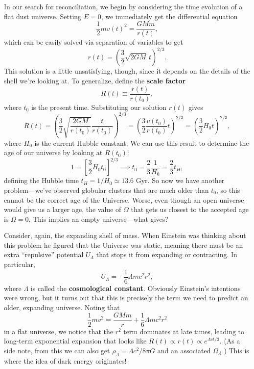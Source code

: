 \documentclass[../a062main.tex]{subfiles}
\begin{document}
In our search for reconciliation, we begin by considering the time evolution of a flat dust universe.
Setting $E = 0$, we immediately get the differential equation
\[ \frac{1}{2} mv(t)^2 = \frac{GMm}{r(t)}, \]
which can be easily solved via separation of variables to get
\[ r(t) = \left( \frac{3}{2} \sqrt{2GM} \,t \right)^{2 / 3}. \]
This solution is a little unsatisfying, though, since it depends on the details of the shell we're looking at.
To generalize, define the \textbf{scale factor}
\[ \boxed{R(t) \equiv \frac{r(t)}{r(t_0)}}, \]
where $t_0$ is the present time.
Substituting our solution $r(t)$ gives
\[ R(t) = \left( \frac{3}{2} \sqrt{\frac{2GM}{r(t_0)}} \frac{t}{r(t_0)} \right)^{2 / 3} = \left( \frac{3}{2} \frac{v(t_0)}{r(t_0)} t \right)^{2 / 3} = \left( \frac{3}{2} H_0 t \right)^{2 / 3}, \]
where $H_0$ is the current Hubble constant.
We can use this result to determine the age of our universe by looking at $R(t_0)$:
\[ 1 = \left[ \frac{3}{2} H_0 t_0 \right]^{2 / 3} \implies t_0 = \frac{2}{3} \frac{1}{H_0} = \frac{2}{3} t_H, \]
defining the Hubble time $t_H = 1 / H_0 \simeq 13.6 \textrm{ Gyr}$.
So now we have another problem---we've observed globular clusters that are much older than $t_0$, so this cannot be the correct age of the Universe.
Worse, even though an open universe would give us a larger age, the value of $\Omega$ that gets us closest to the accepted age is $\Omega = 0$.
This implies an empty universe---what gives?

Consider, again, the expanding shell of mass.
When Einstein was thinking about this problem he figured that the Universe was static, meaning there must be an extra ``repulsive''  potential $U_\Lambda$ that stops it from expanding or contracting.
In particular,
\[ \boxed{U_\Lambda = -\frac{1}{6} \Lambda mc^2 r^2}, \]
where $\Lambda$ is called the \textbf{cosmological constant}.
Obviously Einstein's intentions were wrong, but it turns out that this is precisely the term we need to predict an older, expanding universe.
Noting that
\[ \frac{1}{2} mv^2 = \frac{GMm}{r} + \frac{1}{6} \Lambda mc^2 r^2 \]
in a flat universe, we notice that the $r^2$ term dominates at late times, leading to long-term exponential expansion that looks like $R(t) \propto r(t) \propto e^{\Lambda ct / 3}$.
(As a side note, from this we can also get $\rho_\Lambda = \Lambda c^2 / 8\pi G$ and an associated $\Omega_\Lambda$.)
This is where the idea of dark energy originates!
\end{document}
